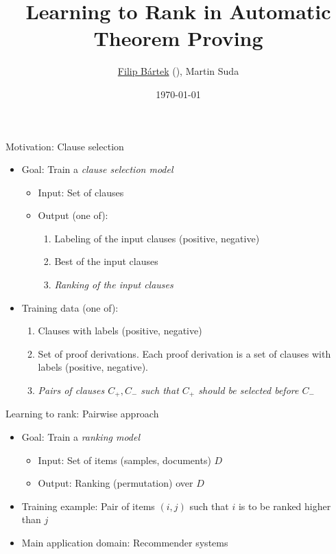 \documentclass{ctuslides}
\title{Learning to Rank in Automatic Theorem Proving}
\author[\underline{Filip Bártek}, Martin Suda]{\underline{Filip Bártek} (\email{filip.bartek@cvut.cz}), Martin Suda}
\institute{\Acrlong{ctu}}
\date{\today}
\begin{document}
\ctutitleframe

\begin{frame}{Motivation: Clause selection}
\begin{itemize}
\item Goal: Train a \emph{clause selection model}
\begin{itemize}
\item Input: Set of clauses
\item Output (one of):
\begin{enumerate}
\item Labeling of the input clauses (positive, negative)
\item Best of the input clauses
\item \emph{Ranking of the input clauses}
\end{enumerate}
\end{itemize}
\item Training data (one of):
\begin{enumerate}
\item Clauses with labels (positive, negative)
\item Set of proof derivations.
Each proof derivation is a set of clauses with labels (positive, negative).
\item \emph{Pairs of clauses $C_+, C_-$ such that $C_+$ should be selected before $C_-$}
\end{enumerate}
\end{itemize}
\end{frame}

\begin{frame}{Learning to rank: Pairwise approach}
\begin{itemize}
\item Goal: Train a \emph{ranking model}
\begin{itemize}
\item Input: Set of items (samples, documents) $D$
\item Output: Ranking (permutation) over $D$
\end{itemize}
\item Training example:
Pair of items $(i, j)$ such that $i$ is to be ranked higher than $j$%
\item Main application domain: Recommender systems
\end{itemize}
\end{frame}
\end{document}
